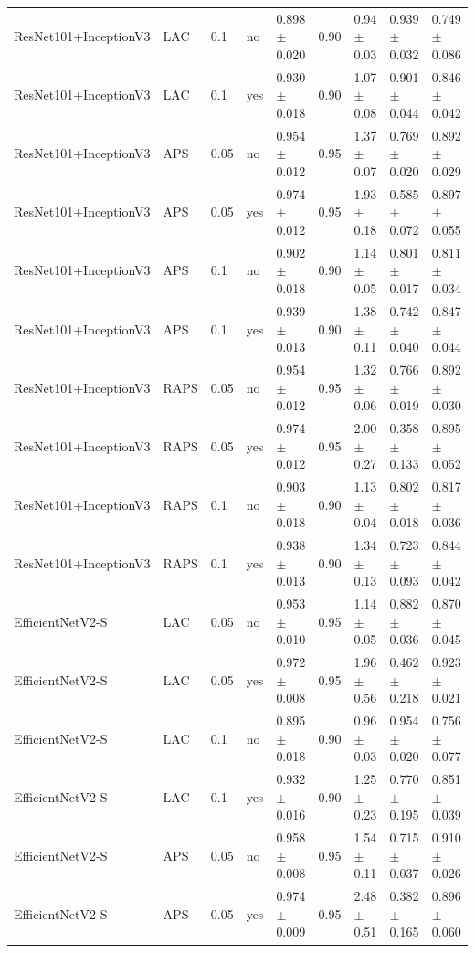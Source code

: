 \begin{table}[ht]
\begin{tabular}{lllllllll}
ResNet101+InceptionV3 & LAC & 0.1 & no & 0.898 $\pm$ 0.020 & 0.90 & 0.94 $\pm$ 0.03 & 0.939 $\pm$ 0.032 & 0.749 $\pm$ 0.086 \\
ResNet101+InceptionV3 & LAC & 0.1 & yes & 0.930 $\pm$ 0.018 & 0.90 & 1.07 $\pm$ 0.08 & 0.901 $\pm$ 0.044 & 0.846 $\pm$ 0.042 \\
ResNet101+InceptionV3 & APS & 0.05 & no & 0.954 $\pm$ 0.012 & 0.95 & 1.37 $\pm$ 0.07 & 0.769 $\pm$ 0.020 & 0.892 $\pm$ 0.029 \\
ResNet101+InceptionV3 & APS & 0.05 & yes & 0.974 $\pm$ 0.012 & 0.95 & 1.93 $\pm$ 0.18 & 0.585 $\pm$ 0.072 & 0.897 $\pm$ 0.055 \\
ResNet101+InceptionV3 & APS & 0.1 & no & 0.902 $\pm$ 0.018 & 0.90 & 1.14 $\pm$ 0.05 & 0.801 $\pm$ 0.017 & 0.811 $\pm$ 0.034 \\
ResNet101+InceptionV3 & APS & 0.1 & yes & 0.939 $\pm$ 0.013 & 0.90 & 1.38 $\pm$ 0.11 & 0.742 $\pm$ 0.040 & 0.847 $\pm$ 0.044 \\
ResNet101+InceptionV3 & RAPS & 0.05 & no & 0.954 $\pm$ 0.012 & 0.95 & 1.32 $\pm$ 0.06 & 0.766 $\pm$ 0.019 & 0.892 $\pm$ 0.030 \\
ResNet101+InceptionV3 & RAPS & 0.05 & yes & 0.974 $\pm$ 0.012 & 0.95 & 2.00 $\pm$ 0.27 & 0.358 $\pm$ 0.133 & 0.895 $\pm$ 0.052 \\
ResNet101+InceptionV3 & RAPS & 0.1 & no & 0.903 $\pm$ 0.018 & 0.90 & 1.13 $\pm$ 0.04 & 0.802 $\pm$ 0.018 & 0.817 $\pm$ 0.036 \\
ResNet101+InceptionV3 & RAPS & 0.1 & yes & 0.938 $\pm$ 0.013 & 0.90 & 1.34 $\pm$ 0.13 & 0.723 $\pm$ 0.093 & 0.844 $\pm$ 0.042 \\
EfficientNetV2-S & LAC & 0.05 & no & 0.953 $\pm$ 0.010 & 0.95 & 1.14 $\pm$ 0.05 & 0.882 $\pm$ 0.036 & 0.870 $\pm$ 0.045 \\
EfficientNetV2-S & LAC & 0.05 & yes & 0.972 $\pm$ 0.008 & 0.95 & 1.96 $\pm$ 0.56 & 0.462 $\pm$ 0.218 & 0.923 $\pm$ 0.021 \\
EfficientNetV2-S & LAC & 0.1 & no & 0.895 $\pm$ 0.018 & 0.90 & 0.96 $\pm$ 0.03 & 0.954 $\pm$ 0.020 & 0.756 $\pm$ 0.077 \\
EfficientNetV2-S & LAC & 0.1 & yes & 0.932 $\pm$ 0.016 & 0.90 & 1.25 $\pm$ 0.23 & 0.770 $\pm$ 0.195 & 0.851 $\pm$ 0.039 \\
EfficientNetV2-S & APS & 0.05 & no & 0.958 $\pm$ 0.008 & 0.95 & 1.54 $\pm$ 0.11 & 0.715 $\pm$ 0.037 & 0.910 $\pm$ 0.026 \\
EfficientNetV2-S & APS & 0.05 & yes & 0.974 $\pm$ 0.009 & 0.95 & 2.48 $\pm$ 0.51 & 0.382 $\pm$ 0.165 & 0.896 $\pm$ 0.060 \\

\end{tabular}
\end{table}
